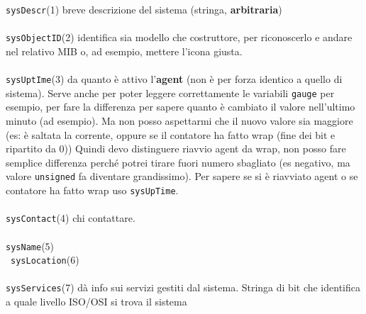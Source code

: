 \documentclass[10pt]{book}
\begin{document}
\texttt{sysDescr}(1) breve descrizione del sistema (stringa, \textbf{arbitraria})\\\\
\texttt{sysObjectID}(2) identifica sia modello che costruttore, per riconoscerlo e andare nel relativo MIB o, ad esempio, mettere l'icona giusta.\\\\
\texttt{sysUptIme}(3) da quanto è attivo l'\textbf{agent} (non è per forza identico a quello di sistema). Serve anche per poter leggere correttamente le variabili \texttt{gauge} per esempio, per fare la differenza per sapere quanto è cambiato il valore nell'ultimo minuto (ad esempio). Ma non posso aspettarmi che il nuovo valore sia maggiore (es: è saltata la corrente, oppure se il contatore ha fatto wrap (fine dei bit e ripartito da 0)) Quindi devo distinguere riavvio agent da wrap, non posso fare semplice differenza perché potrei tirare fuori numero sbagliato (es negativo, ma valore \texttt{unsigned} fa diventare grandissimo). Per sapere se si è riavviato agent o se contatore ha fatto wrap uso \texttt{sysUpTime}.\\\\
\texttt{sysContact}(4) chi contattare.\\\\
\texttt{sysName}(5)\\\
\texttt{sysLocation}(6)\\\\
\texttt{sysServices}(7) dà info sui servizi gestiti dal sistema. Stringa di bit che identifica a quale livello ISO/OSI si trova il sistema
\end{document}
